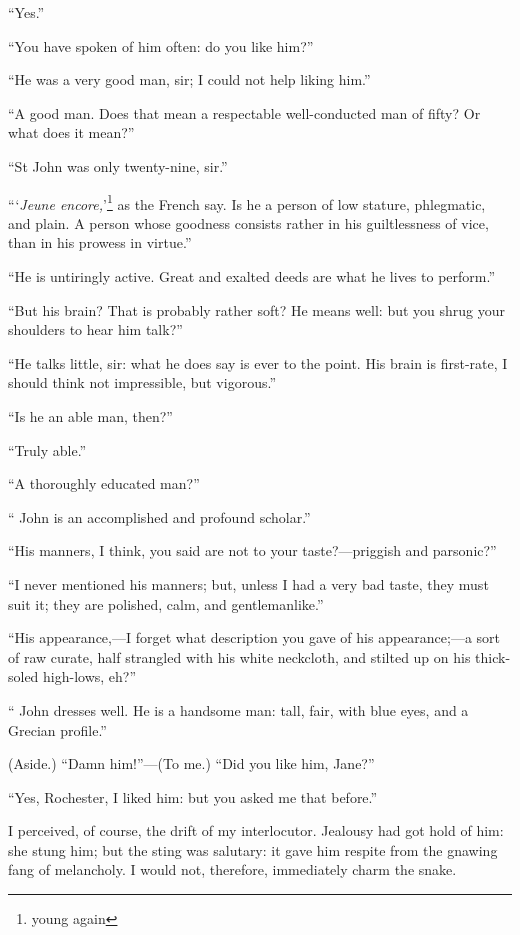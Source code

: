 \enquote{Yes.}

\enquote{You have spoken of him often: do you like him?}

\enquote{He was a very good man, sir; I could not help liking him.}

\enquote{A good man. Does that mean a respectable well-conducted man of
fifty? Or what does it mean?}

\enquote{St John was only twenty-nine, sir.}

\enquote{\foreignquote{french}{\emph{Jeune encore,}}\footnote{young again} as the French say. Is he a person of low
stature, phlegmatic, and plain. A person whose goodness consists rather
in his guiltlessness of vice, than in his prowess in virtue.}

\enquote{He is untiringly active. Great and exalted deeds are what he
lives to perform.}

\enquote{But his brain? That is probably rather soft? He means well:
but you shrug your shoulders to hear him talk?}

\enquote{He talks little, sir: what he does say is ever to the point. 
His brain is first-rate, I should think not impressible, but vigorous.}

\enquote{Is he an able man, then?}

\enquote{Truly able.}

\enquote{A thoroughly educated man?}

\enquote{\St{} John is an accomplished and profound scholar.}

\enquote{His manners, I think, you said are not to your
taste?---priggish and parsonic?}

\enquote{I never mentioned his manners; but, unless I had a very bad
taste, they must suit it; they are polished, calm, and gentlemanlike.}

\enquote{His appearance,---I forget what description you gave of his
appearance;---a sort of raw curate, half strangled with his white
neckcloth, and stilted up on his thick-soled high-lows, eh?}

\enquote{\St{} John dresses well. He is a handsome man: tall, fair, with
blue eyes, and a Grecian profile.}

(Aside.) \enquote{Damn him!}---(To me.) \enquote{Did you like him,
Jane?}

\enquote{Yes, \Mr{} Rochester, I liked him: but you asked me that before.}

I perceived, of course, the drift of my interlocutor. Jealousy had got
hold of him: she stung him; but the sting was salutary: it gave him
respite from the gnawing fang of melancholy. I would not, therefore,
immediately charm the snake.

